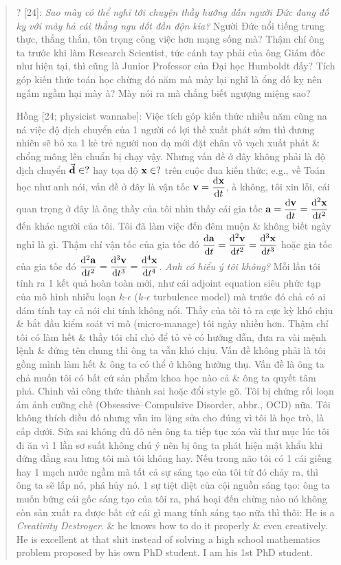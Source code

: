 \documentclass[12pt,oneside]{book}
\begin{document}
\begin{quote}
	{\sf ? [24]}: {\it Sao mày có thể nghĩ tới chuyện thầy hướng dẫn người Đức đang đố kỵ với mày hả cái thằng ngu dốt đần độn kia?} Người Đức nổi tiếng trung thực, thẳng thắn, tôn trọng công việc hơn mạng sống mà? Thậm chí ông ta trước khi làm Research Scientist, tức cánh tay phải của ông Giám đốc như hiện tại, thì cũng là Junior Professor của Đại học Humboldt đấy? Tích góp kiến thức toán học chừng đó năm mà mày lại nghĩ là ổng đố kỵ nên ngấm ngầm hại mày à? Mày nói ra mà chẳng biết ngượng miệng sao?
	
	{\sf Hồng [24; physicist wannabe]}: Việc tích góp kiến thức nhiều năm cũng na ná việc độ dịch chuyển của 1 người có lợi thế xuất phát sớm thì đương nhiên sẽ bỏ xa 1 kẻ trẻ người non dạ mới đặt chân vô vạch xuất phát \& chổng mông lên chuẩn bị chạy vậy. Nhưng vấn đề ở đây không phải là độ dịch chuyển $\vec{\bf d}\in?$ hay tọa độ ${\bf x}\in?$ trên cuộc đua kiến thức, e.g., về Toán học như anh nói, vấn đề ở đây là vận tốc ${\bf v} = \dfrac{{\rm d}{\bf x}}{{\rm d}t}$, à không, tôi xin lỗi, cái quan trọng ở đây là ông thầy của tôi nhìn thấy cái gia tốc ${\bf a} = \dfrac{{\rm d}{\bf v}}{{\rm d}t} = \dfrac{{\rm d}^2{\bf x}}{{\rm d}t^2}$ đến khác người của tôi. Tôi đã làm việc đến đêm muộn \& không biết ngày nghỉ là gì. Thậm chí vận tốc của gia tốc đó $\dfrac{{\rm d}{\bf a}}{{\rm d}t} = \dfrac{{\rm d}^2{\bf v}}{{\rm d}t^2} = \dfrac{{\rm d}^3{\bf x}}{{\rm d}t^3}$ hoặc gia tốc của gia tốc đó $\dfrac{{\rm d}^2{\bf a}}{{\rm d}t^2} = \dfrac{{\rm d}^3{\bf v}}{{\rm d}t^3} = \dfrac{{\rm d}^4{\bf x}}{{\rm d}t^4}$. {\it Anh có hiểu ý tôi không?} Mỗi lần tôi tính ra 1 kết quả hoàn toàn mới, như cái adjoint equation siêu phức tạp của mô hình nhiễu loạn $k$-$\epsilon$ ($k$-$\epsilon$ turbulence model) mà trước đó chả có ai dám tính tay cả nói chi tính không nổi. Thầy của tôi tỏ ra cực kỳ khó chịu \& bắt đầu kiểm soát vi mô (micro-manage) tôi ngày nhiều hơn. Thậm chí tôi có làm hết \& thầy tôi chỉ chỏ để tỏ vẻ có hướng dẫn, đưa ra vài mệnh lệnh \& đứng tên chung thì ông ta vẫn khó chịu. Vấn đề không phải là tôi gồng mình làm hết \& ông ta có thể ở không hưởng thụ. Vấn đề là ông ta chả muốn tôi có bất cứ sản phẩm khoa học nào cả \& ông ta quyết tâm phá. Chỉnh vài công thức thành sai hoặc đổi style gõ. Tôi bị chứng rối loạn ám ảnh cưỡng chế (Obsessive--Compulsive Disorder, abbr., OCD) nữa. Tôi không thích điều đó nhưng vẫn im lặng sửa cho đúng vì tôi là học trò, là cấp dưới. Sửa sai không đủ đô nên ông ta tiếp tục xóa vài thư mục lúc tôi đi ăn vì 1 lần sơ suất không chú ý nên bị ông ta phát hiện mật khẩu khi đứng đằng sau lưng tôi mà tôi không hay. Nếu trong não tôi có 1 cái giếng hay 1 mạch nước ngầm mà tất cả sự sáng tạo của tôi từ đó chảy ra, thì ông ta sẽ lấp nó, phá hủy nó. 1 sự tiệt diệt của cội nguồn sáng tạo: ông ta muốn bứng cái gốc sáng tạo của tôi ra, phá hoại đến chừng nào nó không còn sản xuất ra được bất cứ cái gì mang tính sáng tạo nữa thì thôi: He is a {\it Creativity Destroyer}. \& he knows how to do it properly \& even creatively. He is excellent at that shit instead of solving a high school mathematics problem proposed by his own PhD student. I am his 1st PhD student.
\end{quote}
\end{document}
